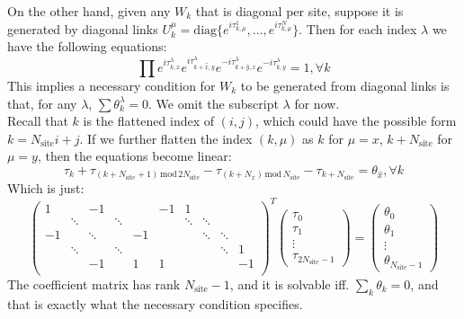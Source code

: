 On the other hand, given any $W_k$ that is diagonal per site, suppose it is generated by diagonal links $U_k^\mu=\text{diag} \{e^{i\tau_{k,\mu}^{1}},\dots, e^{i\tau_{k,\mu}^N}\}$. Then for each index $\lambda$ we have the following equations:
\begin{equation}
    \prod e^{i\tau_{k,x}^\lambda}e^{i\tau_{k+\hat{x},y}^\lambda}e^{-i\tau_{k+\hat{y},x}^\lambda}e^{-i\tau_{k,y}^\lambda}=1, \forall k
\end{equation}
This implies a necessary condition for $W_k$ to be generated from diagonal links is that, for any $\lambda$, $\sum \theta_k^\lambda=0$. We omit the subscript $\lambda$ for now. \\
Recall that $k$ is the flattened index of $(i,j)$, which could have the possible form $k=N_\text{site}i+j$. If we further flatten the index $(k,\mu)$ as $k$ for $\mu=x$, $k+N_\text{site}$ for $\mu=y$, then the equations become linear:
\begin{equation}
    \tau_{k}+\tau_{(k+N_\text{site}+1)\,\text{mod}\, 2N_\text{site}}-\tau_{(k+N_x)\, \text{mod}\, N_\text{site}}-\tau_{k+N_\text{site}}=\theta_{\hat{x}}, \forall k
\end{equation}
Which is just:
\begin{equation}
 \left(\begin{array}{cccccccccc}
      1&&-1&& & -1&1&&&\\
      &\ddots&&\ddots& &&\ddots&\ddots&&\\
      -1&&\ddots&&-1 &&&\ddots&\ddots&\\
      &\ddots&&\ddots& &&&&\ddots&1\\
      &&-1&&1& 1&&&&-1\\
 \end{array}\right)^T\left(\begin{array}{c}\tau_0\\\tau_1\\\vdots\\\tau_{2N_\text{site}-1}\end{array}\right)=
\left(\begin{array}{c}\theta_0\\\theta_1\\\vdots\\\theta_{N_\text{site}-1}\end{array}\right)\label{eq:linear_equation}
\end{equation}
The coefficient matrix has rank $N_\text{site}-1$, and it is solvable iff. $\sum_k\theta_{k}=0$, and that is exactly what the necessary condition specifies.
